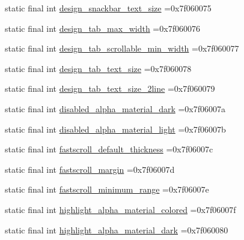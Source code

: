 \begin{DoxyCompactItemize}
\item 
static final int \mbox{\hyperlink{classcom_1_1example_1_1trainawearapplication_1_1_r_1_1dimen_a637ef7e3fc2ead153a082a28b6b6389d}{design\+\_\+snackbar\+\_\+text\+\_\+size}} =0x7f060075
\item 
static final int \mbox{\hyperlink{classcom_1_1example_1_1trainawearapplication_1_1_r_1_1dimen_ab4028f76705003e46be14138fb3f5077}{design\+\_\+tab\+\_\+max\+\_\+width}} =0x7f060076
\item 
static final int \mbox{\hyperlink{classcom_1_1example_1_1trainawearapplication_1_1_r_1_1dimen_a1ec20d36925c37ddffdbcdb4872ab27d}{design\+\_\+tab\+\_\+scrollable\+\_\+min\+\_\+width}} =0x7f060077
\item 
static final int \mbox{\hyperlink{classcom_1_1example_1_1trainawearapplication_1_1_r_1_1dimen_aa430ae9acec3540ac1bb27a751cdf160}{design\+\_\+tab\+\_\+text\+\_\+size}} =0x7f060078
\item 
static final int \mbox{\hyperlink{classcom_1_1example_1_1trainawearapplication_1_1_r_1_1dimen_a62cd6a8c4645d000c3bfe61b91b99db3}{design\+\_\+tab\+\_\+text\+\_\+size\+\_\+2line}} =0x7f060079
\item 
static final int \mbox{\hyperlink{classcom_1_1example_1_1trainawearapplication_1_1_r_1_1dimen_aecb7e17bd6fd407a40469b055a965dc4}{disabled\+\_\+alpha\+\_\+material\+\_\+dark}} =0x7f06007a
\item 
static final int \mbox{\hyperlink{classcom_1_1example_1_1trainawearapplication_1_1_r_1_1dimen_af9f8bf54194613a43dcc1c2ed4467048}{disabled\+\_\+alpha\+\_\+material\+\_\+light}} =0x7f06007b
\item 
static final int \mbox{\hyperlink{classcom_1_1example_1_1trainawearapplication_1_1_r_1_1dimen_a982e35712fd5fb27fe67644871c1a5cb}{fastscroll\+\_\+default\+\_\+thickness}} =0x7f06007c
\item 
static final int \mbox{\hyperlink{classcom_1_1example_1_1trainawearapplication_1_1_r_1_1dimen_a0496932f3244519d481d0ee3437f92c6}{fastscroll\+\_\+margin}} =0x7f06007d
\item 
static final int \mbox{\hyperlink{classcom_1_1example_1_1trainawearapplication_1_1_r_1_1dimen_a4027ebc98e8194be435f2003ec29fe0b}{fastscroll\+\_\+minimum\+\_\+range}} =0x7f06007e
\item 
static final int \mbox{\hyperlink{classcom_1_1example_1_1trainawearapplication_1_1_r_1_1dimen_a1e64654e7d12b0dad88f1d80ecdc03fc}{highlight\+\_\+alpha\+\_\+material\+\_\+colored}} =0x7f06007f
\item 
static final int \mbox{\hyperlink{classcom_1_1example_1_1trainawearapplication_1_1_r_1_1dimen_adce24b7d70795ec9db479d25c83f92aa}{highlight\+\_\+alpha\+\_\+material\+\_\+dark}} =0x7f060080

\end{DoxyCompactItemize}
